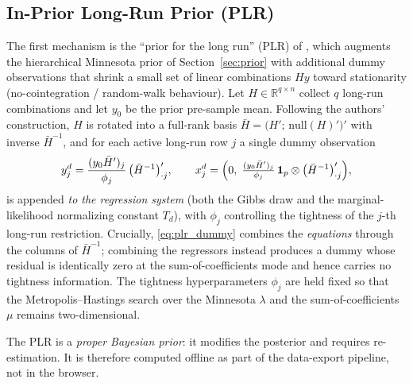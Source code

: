 \documentclass[11pt]{article}
\newcommand{\R}{\mathbb{R}}
\theoremstyle{definition}
\theoremstyle{remark}
\begin{document}
\subsection{In-Prior Long-Run Prior (PLR)}\label{sec:plr}

The first mechanism is the ``prior for the long run'' (PLR) of
\citet{GiannoneLenzaPrimiceri2019}, which augments the hierarchical
Minnesota prior of Section~\ref{sec:prior} with additional dummy
observations that shrink a small set of linear combinations $H y$
toward stationarity (no-cointegration / random-walk behaviour). Let
$H \in \R^{q \times n}$ collect $q$ long-run combinations and let
$y_0$ be the prior pre-sample mean. Following the authors' construction,
$H$ is rotated into a full-rank basis $\bar H = \bigl(H';\, \mathrm{null}(H)'\bigr)'$
with inverse $\bar H^{-1}$, and for each active long-run row $j$ a single
dummy observation
\begin{equation}\label{eq:plr_dummy}
  y^d_j = \frac{(y_0 \bar H')_j}{\phi_j}\, \bigl(\bar H^{-1}\bigr)_{\cdot j}',
  \qquad
  x^d_j = \Bigl(0,\; \tfrac{(y_0 \bar H')_j}{\phi_j}\,
    \mathbf{1}_p \otimes \bigl(\bar H^{-1}\bigr)_{\cdot j}'\Bigr),
\end{equation}
is appended \emph{to the regression system} (both the Gibbs draw and the
marginal-likelihood normalizing constant $T_d$), with $\phi_j$
controlling the tightness of the $j$-th long-run restriction. Crucially,
\eqref{eq:plr_dummy} combines the \emph{equations} through the columns of
$\bar H^{-1}$; combining the regressors instead produces a dummy whose
residual is identically zero at the sum-of-coefficients mode and hence
carries no tightness information. The tightness hyperparameters $\phi_j$
are held fixed so that the Metropolis--Hastings search over the Minnesota
$\lambda$ and the sum-of-coefficients $\mu$ remains two-dimensional.

The PLR is a \emph{proper Bayesian prior}: it modifies the posterior and
requires re-estimation. It is therefore computed offline as part of the
data-export pipeline, not in the browser.
\end{document}
